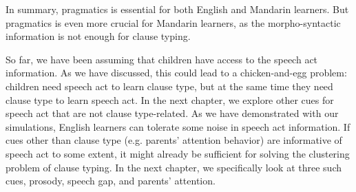 In summary, pragmatics is essential for both English and Mandarin learners. But pragmatics is even more crucial for Mandarin learners, as the morpho-syntactic information is not enough for clause typing. 

So far, we have been assuming that children have access to the speech act information. As we have discussed, this could lead to a chicken-and-egg problem: children need speech act to learn clause type, but at the same time they need clause type to learn speech act. In the next chapter, we explore other cues for speech act that are not clause type-related. As we have demonstrated with our simulations, English learners can tolerate some noise in speech act information. If cues other than clause type (e.g. parents' attention behavior) are informative of speech act to some extent, it might already be sufficient for solving the clustering problem of clause typing. In the next chapter, we specifically look at three such cues, prosody, speech gap, and parents' attention.

